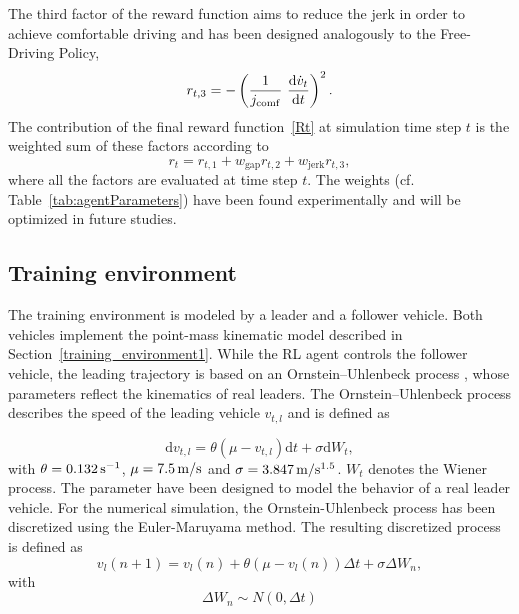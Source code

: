 \documentclass[review]{elsarticle}
\providecommand{\sub}[1]{_{\mathrm{#1}}}  %
\providecommand{\3}{{\ss}}
\begin{document}
	
	
	The third factor of the reward function aims to reduce the jerk in
	order to achieve comfortable driving and has been designed analogously to the Free-Driving Policy, 
	\begin{equation}
	\label{eq:r3_CFP}
	r_{t,3} = -\left(\frac{1}{j\sub{comf}} \ \dv{\dot{v}_t}{t}\right)^2.
	\end{equation}
	The contribution of the final reward function~\eqref{Rt}  at simulation time step $t$ is the weighted
	sum of these factors according to
	\begin{equation}
	\label{rt2}
	r_t = r_{t,1} + w\sub{gap}r_{t,2}+w\sub{jerk}r_{t,3},
	\end{equation}
	where all the factors are evaluated at time step $t$. The weights (cf.
	Table~\ref{tab:agentParameters}) have been found experimentally and
	will be optimized in future studies.
	
	
	
	
	\subsection{Training environment}
	\label{training_environment2}
	The training environment is modeled by a leader and a follower vehicle. Both vehicles implement the point-mass kinematic model described in Section~\ref{training_environment1}. While the RL agent controls the follower vehicle, the leading trajectory is based on an Ornstein–Uhlenbeck process \citep{OU}, whose parameters
	reflect the kinematics of real leaders. The Ornstein–Uhlenbeck process describes
	the speed of the leading vehicle $v_{t,l}$ and is defined as 
	
	\begin{equation} \label{eq:AR1}
	\mathrm{d} v_{t,l}=\theta\left(\mu-v_{t,l}\right) \mathrm{d} t+\sigma \mathrm{d} W_{t},
	\end{equation}
	with $\theta = \unit[0.132]{s^{-1}}$, $\mu = \unit[7.5]{m/s}$ and $\sigma = \unit[3.847]{m/s^{1.5}}$. $W_{t}$ denotes the Wiener process. The parameter have been designed to model the behavior of a real leader vehicle.
	For the numerical simulation, the Ornstein-Uhlenbeck process has been discretized using the Euler-Maruyama method. The resulting discretized process is defined as
	\begin{equation} 
	v_{l}(n+1)=v_{l}(n)+\theta\left(\mu-v_{l}(n)\right) \Delta t+\sigma \Delta W_{n},
	\end{equation}
	with 
	\begin{equation}
	\Delta W_{n} \sim N(0, \Delta t)
	\end{equation}
	
\end{document}
